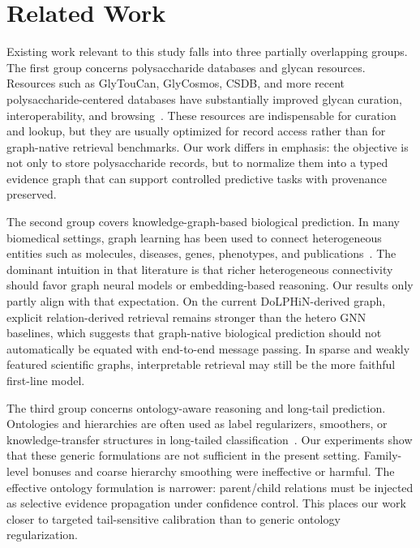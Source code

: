 \documentclass[11pt]{article}
\begin{document}
\section{Related Work}
\label{sec:related-work}

Existing work relevant to this study falls into three partially overlapping groups. The first group concerns polysaccharide databases and glycan resources. Resources such as GlyTouCan, GlyCosmos, CSDB, and more recent polysaccharide-centered databases have substantially improved glycan curation, interoperability, and browsing~\cite{aoki2016glytoucan,yamada2020glycosmos,toukach2015csdb,xin2025dolphin}. These resources are indispensable for curation and lookup, but they are usually optimized for record access rather than for graph-native retrieval benchmarks. Our work differs in emphasis: the objective is not only to store polysaccharide records, but to normalize them into a typed evidence graph that can support controlled predictive tasks with provenance preserved.

The second group covers knowledge-graph-based biological prediction. In many biomedical settings, graph learning has been used to connect heterogeneous entities such as molecules, diseases, genes, phenotypes, and publications~\cite{zhou2020biomedicalkg,chandak2023primekg,crichton2018linkprediction,gema2024kgembeddings,zhao2024community}. The dominant intuition in that literature is that richer heterogeneous connectivity should favor graph neural models or embedding-based reasoning. Our results only partly align with that expectation. On the current DoLPHiN-derived graph, explicit relation-derived retrieval remains stronger than the hetero GNN baselines, which suggests that graph-native biological prediction should not automatically be equated with end-to-end message passing. In sparse and weakly featured scientific graphs, interpretable retrieval may still be the more faithful first-line model.

The third group concerns ontology-aware reasoning and long-tail prediction. Ontologies and hierarchies are often used as label regularizers, smoothers, or knowledge-transfer structures in long-tailed classification~\cite{li2021hierarchical,liu2024multigranularity}. Our experiments show that these generic formulations are not sufficient in the present setting. Family-level bonuses and coarse hierarchy smoothing were ineffective or harmful. The effective ontology formulation is narrower: parent/child relations must be injected as selective evidence propagation under confidence control. This places our work closer to targeted tail-sensitive calibration than to generic ontology regularization.
\end{document}
